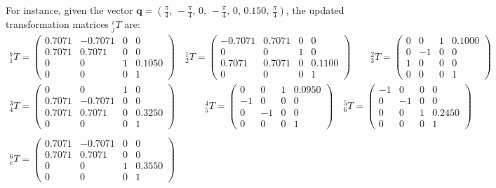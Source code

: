 For instance, given the vector $\mathbf{q} = (\frac{\pi}{4},\,-\frac{\pi}{4},\,0,\,-\frac{\pi}{4},\,0,\,0.150,\,\frac{\pi}{4})$, the updated transformation matrices $^i_j T$ are: 
\begin{gather*}
	^b_1 T = \begin{pmatrix}
		0.7071 & -0.7071 & 0 & 0 \\
		0.7071 & 0.7071 & 0 & 0 \\
		0 & 0 & 1 & 0.1050 \\
		0 & 0 & 0 & 1
	\end{pmatrix} \quad
	^1_2 T = \begin{pmatrix}
		-0.7071 & 0.7071 & 0 & 0 \\
		0 & 0 & 1 & 0 \\
		0.7071 & 0.7071 & 0 & 0.1100 \\
		0 & 0 & 0 & 1
	\end{pmatrix} \quad
	\quad ^2_3 T = \begin{pmatrix}
		0 & 0 & 1 & 0.1000 \\
		0 & -1 & 0 & 0 \\
		1 & 0 & 0 & 0 \\
		0 & 0 & 0 & 1
	\end{pmatrix} \\
	^3_4 T = \begin{pmatrix}
		0 & 0 & 1 & 0 \\
		0.7071 & -0.7071 & 0 & 0 \\
		0.7071 & 0.7071 & 0 & 0.3250 \\
		0 & 0 & 0 & 1
	\end{pmatrix} \quad
	\quad \quad ^4_5 T = \begin{pmatrix}
		0 & 0 & 1 & 0.0950 \\
		-1 & 0 & 0 & 0 \\
		0 & -1 & 0 & 0 \\
		0 & 0 & 0 & 1
	\end{pmatrix} \quad
	^5_6 T = \begin{pmatrix}
		-1 & 0 & 0 & 0 \\
		0 & -1 & 0 & 0 \\
		0 & 0 & 1 & 0.2450 \\
		0 & 0 & 0 & 1
	\end{pmatrix} \quad \\
	\\
	^6_e T = \begin{pmatrix}
		0.7071 & -0.7071 & 0 & 0 \\
		0.7071 & 0.7071 & 0 & 0 \\
		0 & 0 & 1 & 0.3550 \\
		0 & 0 & 0 & 1
	\end{pmatrix} \quad
	\nonumber
\end{gather*}
